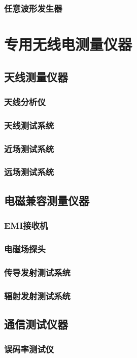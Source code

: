 \documentclass[12pt,UTF8]{ctexbook}
\begin{document}
\section{任意波形发生器}

\part{专用无线电测量仪器}

\chapter{天线测量仪器}
\section{天线分析仪}
\section{天线测试系统}
\section{近场测试系统}
\section{远场测试系统}

\chapter{电磁兼容测量仪器}
\section{EMI接收机}
\section{电磁场探头}
\section{传导发射测试系统}
\section{辐射发射测试系统}

\chapter{通信测试仪器}
\section{误码率测试仪}
\end{document}
